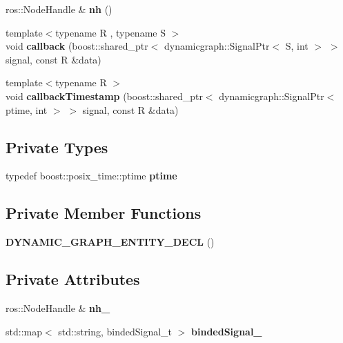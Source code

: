 \begin{DoxyCompactItemize}
\item 
\mbox{\label{classdynamic__graph_1_1RosSubscribe_a093c394243939de8a085ae774ad05493}} 
ros\+::\+Node\+Handle \& {\bfseries nh} ()
\item 
\mbox{\label{classdynamic__graph_1_1RosSubscribe_acdf8089899afd8364f75ac2b70b3269f}} 
{\footnotesize template$<$typename R , typename S $>$ }\\void {\bfseries callback} (boost\+::shared\+\_\+ptr$<$ dynamicgraph\+::\+Signal\+Ptr$<$ S, int $>$ $>$ signal, const R \&data)
\item 
\mbox{\label{classdynamic__graph_1_1RosSubscribe_a6cb2a713a53d3cbebeeac921ba245954}} 
{\footnotesize template$<$typename R $>$ }\\void {\bfseries callback\+Timestamp} (boost\+::shared\+\_\+ptr$<$ dynamicgraph\+::\+Signal\+Ptr$<$ ptime, int $>$ $>$ signal, const R \&data)
\end{DoxyCompactItemize}
\subsection*{Private Types}
\begin{DoxyCompactItemize}
\item 
\mbox{\label{classdynamic__graph_1_1RosSubscribe_a78c93ebf092b3e232d8db27e1ae0225f}} 
typedef boost\+::posix\+\_\+time\+::ptime {\bfseries ptime}
\end{DoxyCompactItemize}
\subsection*{Private Member Functions}
\begin{DoxyCompactItemize}
\item 
\mbox{\label{classdynamic__graph_1_1RosSubscribe_adb61288448d5efe7bc73cc78b9bad700}} 
{\bfseries D\+Y\+N\+A\+M\+I\+C\+\_\+\+G\+R\+A\+P\+H\+\_\+\+E\+N\+T\+I\+T\+Y\+\_\+\+D\+E\+CL} ()
\end{DoxyCompactItemize}
\subsection*{Private Attributes}
\begin{DoxyCompactItemize}
\item 
\mbox{\label{classdynamic__graph_1_1RosSubscribe_af3ad89b1e8e131eee45f0236c3cd0bbd}} 
ros\+::\+Node\+Handle \& {\bfseries nh\+\_\+}
\item 
\mbox{\label{classdynamic__graph_1_1RosSubscribe_a7f8a41ae314f370a4a33157741a2d8f1}} 
std\+::map$<$ std\+::string, binded\+Signal\+\_\+t $>$ {\bfseries binded\+Signal\+\_\+}
\end{DoxyCompactItemize}
